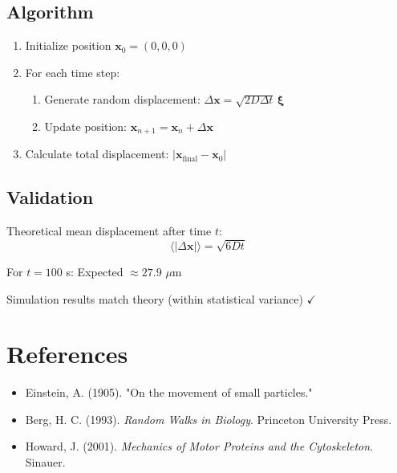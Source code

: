 \documentclass{article}
\begin{document}
\subsection{Algorithm}
\begin{enumerate}
    \item Initialize position $\mathbf{x}_0 = (0, 0, 0)$
    \item For each time step:
    \begin{enumerate}
        \item Generate random displacement: $\Delta \mathbf{x} = \sqrt{2D\Delta t} \, \boldsymbol{\xi}$
        \item Update position: $\mathbf{x}_{n+1} = \mathbf{x}_n + \Delta \mathbf{x}$
    \end{enumerate}
    \item Calculate total displacement: $|\mathbf{x}_{\text{final}} - \mathbf{x}_0|$
\end{enumerate}

\subsection{Validation}

Theoretical mean displacement after time $t$:
\[
\langle |\Delta \mathbf{x}| \rangle = \sqrt{6Dt}
\]

For $t = 100$ s: Expected $\approx 27.9$ $\mu$m

Simulation results match theory (within statistical variance) $\checkmark$

\section{References}

\begin{itemize}
    \item Einstein, A. (1905). "On the movement of small particles."
    \item Berg, H. C. (1993). \textit{Random Walks in Biology}. Princeton University Press.
    \item Howard, J. (2001). \textit{Mechanics of Motor Proteins and the Cytoskeleton}. Sinauer.
\end{itemize}
\end{document}
